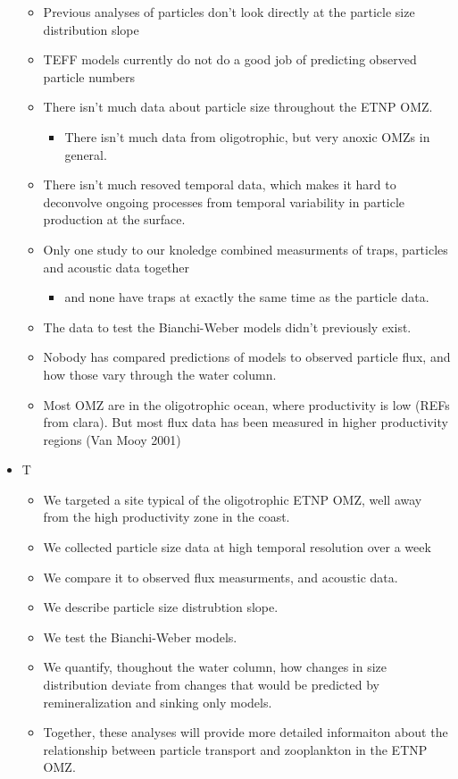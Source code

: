 \documentclass[]{article}
\providecommand{\tightlist}{%
  \setlength{\itemsep}{0pt}\setlength{\parskip}{0pt}}
\begin{document}
\begin{itemize}
  \begin{itemize}
  \tightlist
  \item
    Previous analyses of particles don't look directly at the particle
    size distribution slope
  \item
    TEFF models currently do not do a good job of predicting observed
    particle numbers
  \item
    There isn't much data about particle size throughout the ETNP OMZ.

    \begin{itemize}
    \tightlist
    \item
      There isn't much data from oligotrophic, but very anoxic OMZs in
      general.
    \end{itemize}
  \item
    There isn't much resoved temporal data, which makes it hard to
    deconvolve ongoing processes from temporal variability in particle
    production at the surface.
  \item
    Only one study to our knoledge combined measurments of traps,
    particles and acoustic data together

    \begin{itemize}
    \tightlist
    \item
      and none have traps at exactly the same time as the particle data.
    \end{itemize}
  \item
    The data to test the Bianchi-Weber models didn't previously exist.
  \item
    Nobody has compared predictions of models to observed particle flux,
    and how those vary through the water column.
  \item
    Most OMZ are in the oligotrophic ocean, where productivity is low
    (REFs from clara). But most flux data has been measured in higher
    productivity regions (Van Mooy 2001)
  \end{itemize}
\item
  T

  \begin{itemize}
  \tightlist
  \item
    We targeted a site typical of the oligotrophic ETNP OMZ, well away
    from the high productivity zone in the coast.
  \item
    We collected particle size data at high temporal resolution over a
    week
  \item
    We compare it to observed flux measurments, and acoustic data.
  \item
    We describe particle size distrubtion slope.
  \item
    We test the Bianchi-Weber models.
  \item
    We quantify, thoughout the water column, how changes in size
    distribution deviate from changes that would be predicted by
    remineralization and sinking only models.
  \item
    Together, these analyses will provide more detailed informaiton
    about the relationship between particle transport and zooplankton in
    the ETNP OMZ.
  \end{itemize}
\end{itemize}
\end{document}
